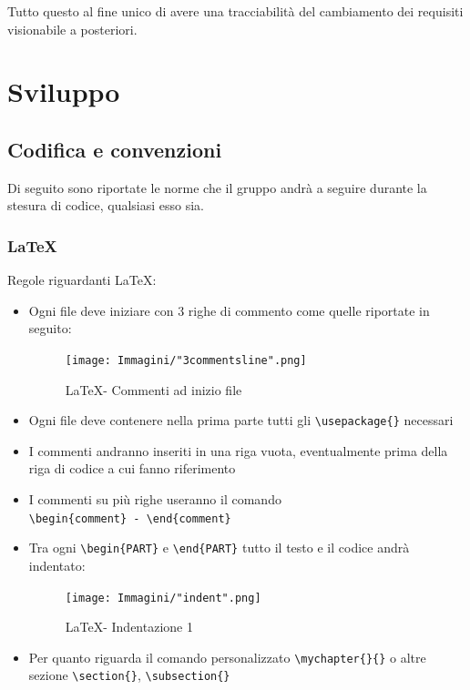 \documentclass[a4paper]{report}
\newcommand{\mychapter}[2]{
	\setcounter{chapter}{#1}
	\setcounter{section}{0}
	\setcounter{subsection}{1}
	\chapter*{#2}
	\addcontentsline{toc}{chapter}{#2}
}
\begin{document}
	Tutto questo al fine unico di avere una tracciabilità del cambiamento dei requisiti visionabile a posteriori.
	\section{Sviluppo}
	\subsection{Codifica e convenzioni}
	Di seguito sono riportate le norme che il gruppo andrà a seguire durante la stesura di codice, qualsiasi esso sia.
	\subsubsection{\LaTeX}
	Regole riguardanti \LaTeX :
	\begin{itemize}
		\item Ogni file deve iniziare con 3 righe di commento come quelle riportate in seguito:
		\begin{figure}[H]
			\centering
			\texttt{[image: Immagini/"3commentsline".png]}
			\caption{\LaTeX \space - Commenti ad inizio file}
		\end{figure}
		\item Ogni file deve contenere nella prima parte tutti gli \verb|\usepackage{}| necessari
		\item I commenti andranno inseriti in una riga vuota, eventualmente prima della riga di 
		codice a cui fanno riferimento
		\item I commenti su più righe useranno il comando \\ \verb|\begin{comment} - \end{comment}|
		\item Tra ogni \verb|\begin{PART}| e \verb|\end{PART}| tutto il testo e il codice andrà indentato:
		\begin{figure}[H]
			\centering
			\texttt{[image: Immagini/"indent".png]}
			\caption{\LaTeX \space - Indentazione 1}
		\end{figure}
		\item Per quanto riguarda il comando personalizzato \verb|\mychapter{}{}| o altre sezione \verb|\section{}|, \verb|\subsection{}| 

\end{itemize}
\end{document}
